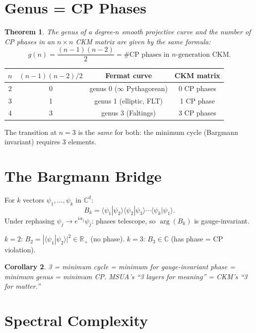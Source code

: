 \documentclass[12pt]{article}
\newtheorem{theorem}{Theorem}[section]
\newtheorem{corollary}[theorem]{Corollary}
\theoremstyle{remark}
\newcommand{\CC}{\mathbb{C}}
\newcommand{\RR}{\mathbb{R}}
\begin{document}
\section{Genus = CP Phases}

\begin{theorem}
The genus of a degree-$n$ smooth projective curve and the
number of CP phases in an $n \times n$ CKM matrix are given
by the \emph{same formula}:
\[
  g(n) = \frac{(n-1)(n-2)}{2}
  = \text{\# CP phases in $n$-generation CKM}.
\]
\end{theorem}

\begin{center}
\begin{tabular}{cccc}
\toprule
$n$ & $(n{-}1)(n{-}2)/2$ & Fermat curve & CKM matrix \\
\midrule
2 & 0 & genus 0 ($\infty$ Pythagorean) & 0 CP phases \\
3 & 1 & genus 1 (elliptic, FLT) & 1 CP phase \\
4 & 3 & genus 3 (Faltings) & 3 CP phases \\
\bottomrule
\end{tabular}
\end{center}

The transition at $n = 3$ is the \emph{same} for both:
the minimum cycle (Bargmann invariant) requires 3 elements.

\section{The Bargmann Bridge}

For $k$ vectors $\psi_1, \ldots, \psi_k$ in $\CC^d$:
\[
  B_k = \langle\psi_1|\psi_2\rangle
        \langle\psi_2|\psi_3\rangle
        \cdots \langle\psi_k|\psi_1\rangle.
\]
Under rephasing $\psi_j \to e^{i\alpha_j}\psi_j$:
phases telescope, so $\arg(B_k)$ is gauge-invariant.

$k = 2$: $B_2 = |\langle\psi_1|\psi_2\rangle|^2 \in \RR_+$
(no phase). $k = 3$: $B_3 \in \CC$ (has phase = CP violation).

\begin{corollary}
3 = minimum cycle = minimum for gauge-invariant phase
= minimum genus = minimum CP.
MSUA's ``3 layers for meaning'' = CKM's ``3 for matter.''
\end{corollary}

\section{Spectral Complexity}
\end{document}
